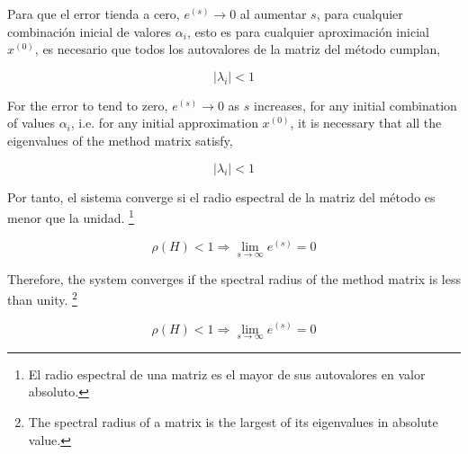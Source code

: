 \begin{paracol}{2}
Para que el error tienda a cero, $e^{(s)}\rightarrow 0$ al aumentar $s$, para cualquier combinación inicial de valores $\alpha_i$, esto es para cualquier aproximación inicial $x^{(0)}$, es necesario que todos los autovalores de la matriz del método cumplan,

\begin{equation*}
\vert \lambda_i \vert < 1
\end{equation*}

\switchcolumn
For the error to tend to zero, $e^{(s)}\rightarrow 0$ as $s$ increases, for any initial combination of values $\alpha_i$, i.e. for any initial approximation $x^{(0)}$, it is necessary that all the eigenvalues of the method matrix satisfy,

\begin{equation*}
\vert \lambda_i \vert < 1
\end{equation*}

\switchcolumn

Por tanto, el sistema converge si el radio espectral de la matriz del método es menor que la unidad. \footnote{El radio espectral de una matriz es el mayor de sus autovalores en valor absoluto.}

\begin{equation*}
\rho(H)<1 \Rightarrow \lim_{s\rightarrow \infty}e^{(s)}=0
\end{equation*}

\switchcolumn
Therefore, the system converges if the spectral radius of the method matrix is less than unity. \footnote{The spectral radius of a matrix is the largest of its eigenvalues in absolute value.}

\begin{equation*}
\rho(H)<1 \Rightarrow \lim_{s\rightarrow \infty}e^{(s)}=0
\end{equation*}

\end{paracol}

